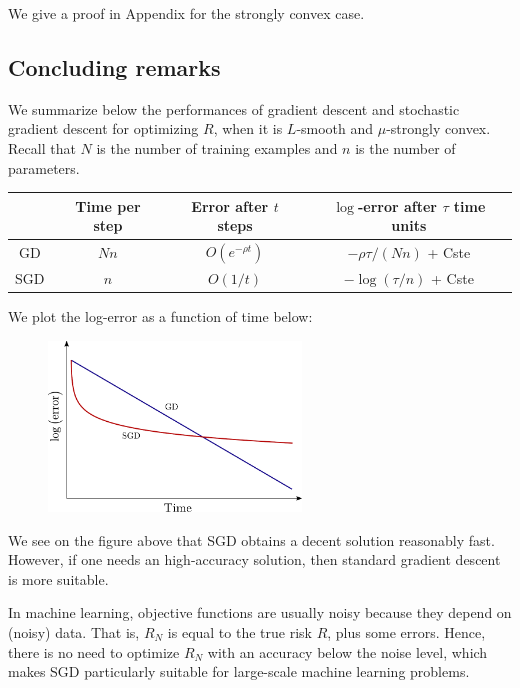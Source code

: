 \documentclass[11pt,nocut]{article}
\begin{document}
We give a proof in Appendix for the strongly convex case.

\subsection{Concluding remarks}\label{sec:concluding}

We summarize below the performances of gradient descent and stochastic gradient descent for optimizing $R$, when it is $L$-smooth and $\mu$-strongly convex. Recall that $N$ is the number of training examples and $n$ is the number of parameters.
\begin{center}
\begin{tabular}{ |c|c|c|c| } 
 \hline
 & Time per step & Error after $t$ steps & $\log$-error after $\tau$ time units \\
 \hline
	GD & $Nn$ & $O(e^{-\rho t})$ & $-\rho \tau / (Nn)$ + {\rm Cste}\\ 
	SGD & $n$ & $O(1/t)$ & $-\log(\tau / n)$ + {\rm Cste}\\ 
 \hline
\end{tabular}
\end{center}

We plot the log-error as a function of time below:

\begin{figure}[H]
	\begin{center}
		\includegraphics[width=0.6\textwidth]{figures/gd_sgd.pdf}
	\end{center}
\end{figure}

We see on the figure above that SGD obtains a decent solution reasonably fast. However, if one needs an high-accuracy solution, then standard gradient descent is more suitable.

In machine learning, objective functions are usually noisy because they depend on (noisy) data. That is, $R_N$ is equal to the true risk $R$, plus some errors.
Hence, there is no need to optimize $R_N$ with an accuracy below the noise level, which makes SGD particularly suitable for large-scale machine learning problems.
\end{document}

